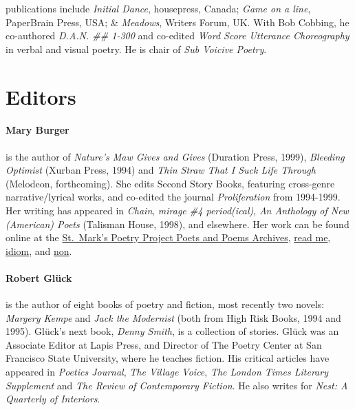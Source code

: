 \documentclass[
]{memoir}
\begin{document}
publications include \emph{Initial Dance}, housepress, Canada;
\emph{Game on a line}, PaperBrain Press, USA; \& \emph{Meadows}, Writers
Forum, UK. With Bob Cobbing, he co-authored \emph{D.A.N. \#\# 1-300} and
co-edited \emph{Word Score Utterance Choreography} in verbal and visual
poetry. He is chair of \emph{Sub Voicive Poetry}.

\hypertarget{editors}{%
\section*{Editors}\label{editors}}

\hypertarget{mary-burger-2}{%
\paragraph{Mary Burger}\label{mary-burger-2}}

is the author of \emph{Nature's Maw Gives and Gives} (Duration Press,
1999), \emph{Bleeding Optimist} (Xurban Press, 1994) and \emph{Thin
Straw That I Suck Life Through} (Melodeon, forthcoming{)}. She edits
Second Story Books, featuring cross-genre narrative/lyrical works, and
co-edited the journal \emph{Proliferation} from 1994-1999. Her writing
has appeared in \emph{Chain}, \emph{mirage \#4 period(ical)}, \emph{An
Anthology of New (American) Poets} (Talisman House, 1998), and
elsewhere. Her work can be found online at the
\href{http://www.poetryproject.com/prevpoet.html}{St.~Mark's Poetry
Project Poets and Poems Archives},
\href{http://www.jps.net/nada/issueone.htm}{read me},
\href{http://www.idiomart.com}{idiom}, and
\href{http://socrates.berkeley.edu/\%7Emoriarty/index.html}{non}.

\hypertarget{robert-gluxfcck-1}{%
\paragraph{Robert Glück}\label{robert-gluxfcck-1}}

is the author of eight books of poetry and fiction, most recently two
novels: \emph{Margery Kempe} and \emph{Jack the Modernist} (both from
High Risk Books, 1994 and 1995). Glück's next book, \emph{Denny Smith},
is a collection of stories. Glück was an Associate Editor at Lapis
Press, and Director of The Poetry Center at San Francisco State
University, where he teaches fiction. His critical articles have
appeared in \emph{Poetics Journal}, \emph{The Village Voice}, \emph{The
London Times Literary Supplement} and \emph{The Review of Contemporary
Fiction}. He also writes for \emph{Nest: A Quarterly of Interiors}.
\end{document}
